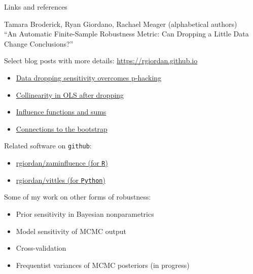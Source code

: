 \begin{frame}{Links and references}

\footnotesize

Tamara Broderick, Ryan Giordano, Rachael Meager
(alphabetical authors) \\
``An Automatic Finite-Sample Robustness Metric: Can Dropping a Little Data Change Conclusions?''

\hrulefill

Select blog posts with more details: \hspace{1em}\url{https://rgiordan.github.io}
\begin{itemize}
\item \href{https://rgiordan.github.io/robustness/2021/09/17/amip_p_hacking.html}
    {Data dropping sensitivity overcomes p-hacking}
\item \href{https://rgiordan.github.io/amip/2021/12/17/reweighted_colinear_note.html}
    {Collinearity in OLS after dropping}
\item \href{https://rgiordan.github.io/amip/2021/12/01/influence_is_sum.html}
    {Influence functions and sums}
\item \href{https://rgiordan.github.io/amip/2021/11/08/bootstrap_influence.html}
    {Connections to the bootstrap}
\end{itemize}


\hrulefill

Related software on \texttt{github}:
\begin{itemize}
\item \href{https://github.com/rgiordan/zaminfluence}
{rgiordan/zaminfluence (for \texttt{R})}
\item \href{https://github.com/rgiordan/vittles}
{rgiordan/vittles (for \texttt{Python})}
\end{itemize}

\hrulefill

Some of my work on other forms of robustness:
%
\begin{itemize}
    \item Prior sensitivity in Bayesian nonparametrics \citep{giordano2021bnp}
    \item Model sensitivity of MCMC output \citep{giordano2018covariances}
    \item Cross-validation \citep{giordano2019swiss}
    \item Frequentist variances of MCMC posteriors (in progress)
\end{itemize}

\end{frame}


